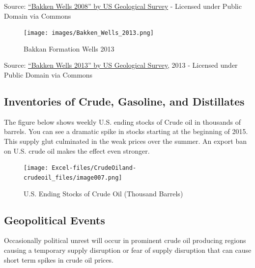 \documentclass[
  letterpaper,
  DIV=11,
  numbers=noendperiod]{scrreprt}
\begin{document}
Source:
\href{https://commons.wikimedia.org/wiki/File:Bakken_Wells_2008.png\#/media/File:Bakken_Wells_2008.png}{``Bakken
Wells 2008'' by US Geological Survey} - Licensed under Public Domain via
Commons

\begin{figure}

{\centering \texttt{[image: images/Bakken\_Wells\_2013.png]}

}

\caption{Bakkan Formation Wells 2013}

\end{figure}

Source:
\href{https://commons.wikimedia.org/wiki/File:Bakken_Wells_2013.png\#/media/File:Bakken_Wells_2013.png}{``Bakken
Wells 2013'' by US Geological Survey}, 2013 - Licensed under Public
Domain via Commons

\hypertarget{inventories-of-crude-gasoline-and-distillates}{%
\subsection{Inventories of Crude, Gasoline, and
Distillates}\label{inventories-of-crude-gasoline-and-distillates}}

The figure below shows weekly U.S. ending stocks of Crude oil in
thousands of barrels. You can see a dramatic spike in stocks starting at
the beginning of 2015. This supply glut culminated in the weak prices
over the summer. An export ban on U.S. crude oil makes the effect even
stronger.

\begin{figure}

{\centering \texttt{[image: Excel-files/CrudeOiland-crudeoil\_files/image007.png]}

}

\caption{U.S. Ending Stocks of Crude Oil (Thousand Barrels)}

\end{figure}

\hypertarget{geopolitical-events}{%
\subsection{Geopolitical Events}\label{geopolitical-events}}

Occasionally political unrest will occur in prominent crude oil
producing regions causing a temporary supply disruption or fear of
supply disruption that can cause short term spikes in crude oil prices.
\end{document}
